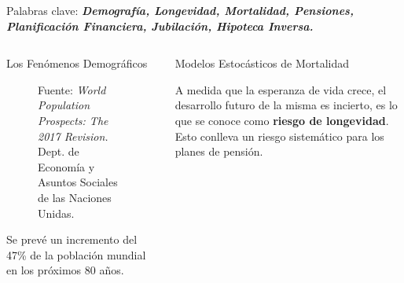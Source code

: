 \documentclass[]{beamer}
\begin{document}
\begin{frame}{\vspace{1ex}\hfill Palabras clave: \bfseries \textit{Demograf\'ia, Longevidad, Mortalidad, Pensiones, Planificaci\'on Financiera, Jubilaci\'on, Hipoteca Inversa.}}
\begin{columns}[t]
\begin{block}{Los Fen\'omenos Demogr\'aficos}
\begin{multicols}{2}
				\begin{figure}[h]
					\centering
					\caption{\small Fuente: \textit{World Population Prospects: The 2017 Revision.}  Dept. de Econom\'ia y Asuntos Sociales de las Naciones Unidas. }
					\label{poblacion}
				\end{figure}
				\vspace{-0.9cm}
				Se prev\'e un incremento del 47\% de la poblaci\'on mundial en los pr\'oximos 80 a\~nos.
			\end{multicols}
		\end{block}

\vspace{-0.5cm}
		\begin{block}{Modelos Estoc\'asticos de Mortalidad}\vspace{-0.5cm}
			\setlength{\parindent}{1.2em}
			\setlength{\parskip}{1ex}

			A medida que la esperanza de vida crece, el desarrollo futuro de la misma es incierto, es lo que se conoce como \textbf{riesgo de longevidad}. Esto conlleva un riesgo sistem\'atico para los planes de pensi\'on.
\vspace{-1cm}     %


\end{block}
\end{columns}
\end{frame}
\end{document}

